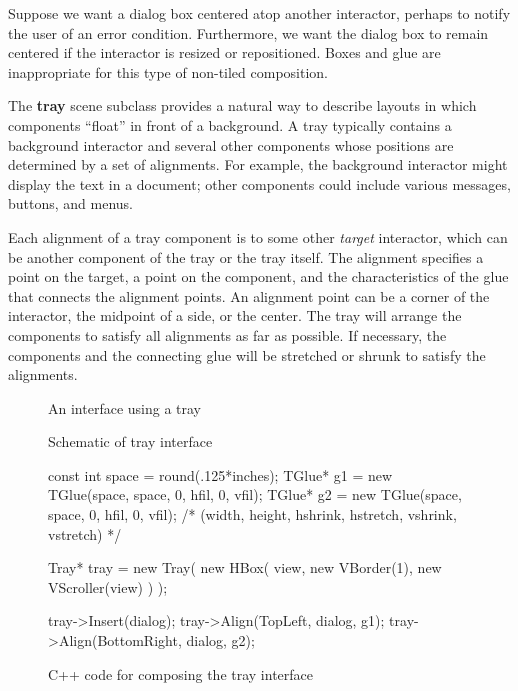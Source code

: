 Suppose we want a dialog box centered atop another interactor, perhaps
to notify the user of an error condition.  Furthermore, we want the
dialog box to remain centered if the interactor is resized or
repositioned.  Boxes and glue are inappropriate for this type of
non-tiled composition.

The {\bf tray} scene subclass provides a natural way to describe layouts in
which components ``float'' in front of a background.  A tray
typically contains a background interactor
and several other components whose positions are determined by a
set of alignments.  For example, the background
interactor might display the text in a document;
other components could include various messages, buttons, and menus.

Each alignment of a tray component is to some other {\em target}
interactor, which can be another component of the tray or the tray itself.  The
alignment specifies a point on the target, a point on the component, and the
characteristics of the glue that connects the alignment points.
An alignment point can be a corner of the interactor, the midpoint of a
side, or the center.  The tray will arrange the components to satisfy all
alignments as far as possible.  If necessary,
the components and the connecting glue will
be stretched or shrunk to satisfy the alignments.

\begin{figure}
\vspace{1.75in}
\caption{An interface using a tray}
\label{tray:tray1}
\end{figure}

\begin{figure}
\vspace{2.5in}
\caption{Schematic of tray interface}
\label{tray:schematic}
\end{figure}

\begin{figure*}
\begin{code}{.5in}
const int space = round(.125*inches);
TGlue* g1 = new TGlue(space, space, 0, hfil, 0, vfil);
TGlue* g2 = new TGlue(space, space, 0, hfil, 0, vfil);
        /* (width, height, hshrink, hstretch, vshrink, vstretch) */

Tray* tray = new Tray(
    new HBox(
        view,
        new VBorder(1),
        new VScroller(view)
    )
);

tray->Insert(dialog);
tray->Align(TopLeft, dialog, g1);
tray->Align(BottomRight, dialog, g2);
\end{code}
\vspace{1ex}
\caption{C++ code for composing the tray interface}
\label{tray:code}
\end{figure*}

